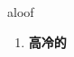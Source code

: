 
\begin{frame}
{\huge aloof}
\begin{center}
\begin{enumerate}\Large
  \item \textbf{高冷的}
\end{enumerate}
\end{center}
\end{frame}
